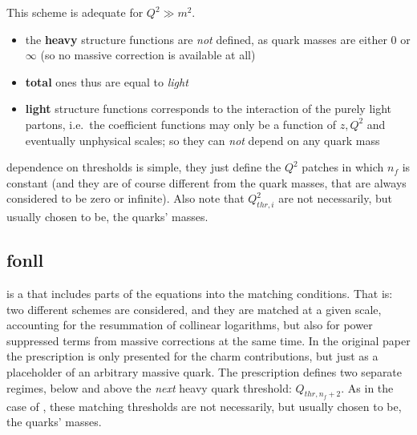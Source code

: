 This scheme is adequate for $Q^2\gg m^2$.

\begin{itemize}
\item the \textbf{heavy} structure functions are \textit{not} defined, as quark
  masses are either $0$ or $\infty$ (so no massive correction is available at
  all)
\item \textbf{total} ones thus are equal to \textit{light}
\item \textbf{light} structure functions corresponds to the interaction of the
  purely light partons, i.e.\ the coefficient functions may only be a function
  of $z,Q^2$ and eventually unphysical scales; so they can \textit{not} depend
  on any quark mass
\end{itemize}

\zmvfns dependence on thresholds is simple, they just define the $Q^2$
patches in which $n_f$ is constant (and they are of course different from
the quark masses, that are always considered to be zero or infinite).
Also note that $Q_{thr,i}^2$ are not necessarily, but usually chosen to be, the
quarks' masses.

\subsection[FONLL]{\acrfull{fonll}}
\label{sec:dis/fonll}

\fonll \cite{Forte:2010ta} is a \gmvfns that includes parts of the \dglap
equations into the matching conditions.
That is: two different schemes are considered, and they are matched at a given
scale, accounting for the resummation of collinear logarithms, but also for
power suppressed terms from massive corrections at the same time.
%
In the original paper the prescription is only presented for the charm
contributions, but just as a placeholder of an arbitrary massive quark.
%
The prescription defines two separate regimes, below and above the
\textit{next} heavy quark threshold: $Q_{thr,n_f+2}$.
%
As in the case of \zmvfns, these matching thresholds are not necessarily, but
usually chosen to be, the quarks' masses.

